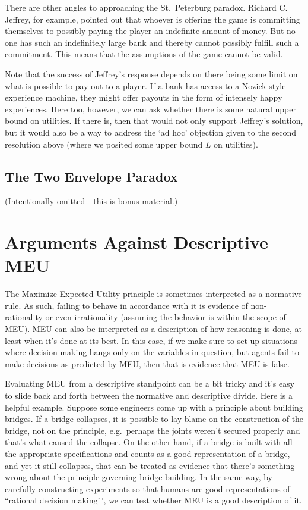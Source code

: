 \documentclass[]{tufte-book}
\begin{document}
There are other angles to approaching the St.~Peterburg paradox. Richard C. Jeffrey, for example, pointed out that whoever is offering the game is committing themselves to possibly paying the player an indefinite amount of money. But no one has such an indefinitely large bank and thereby cannot possibly fulfill such a commitment. This means that the assumptions of the game cannot be valid.

Note that the success of Jeffrey's response depends on there being some limit on what is possible to pay out to a player. If a bank has access to a Nozick-style experience machine, they might offer payouts in the form of intensely happy experiences. Here too, however, we can ask whether there is some natural upper bound on utilities. If there is, then that would not only support Jeffrey's solution, but it would also be a way to address the `ad hoc' objection given to the second resolution above (where we posited some upper bound \(L\) on utilities).

\hypertarget{the-two-envelope-paradox}{%
\subsection{The Two Envelope Paradox}\label{the-two-envelope-paradox}}

(Intentionally omitted - this is bonus material.)

\hypertarget{arguments-against-descriptive-meu}{%
\section{Arguments Against Descriptive MEU}\label{arguments-against-descriptive-meu}}

The Maximize Expected Utility principle is sometimes interpreted as a normative rule. As such, failing to behave in accordance with it is evidence of non-rationality or even irrationality (assuming the behavior is within the scope of MEU). MEU can also be interpreted as a description of how reasoning is done, at least when it's done at its best. In this case, if we make sure to set up situations where decision making hangs only on the variables in question, but agents fail to make decisions as predicted by MEU, then that is evidence that MEU is false.

Evaluating MEU from a descriptive standpoint can be a bit tricky and it's easy to slide back and forth between the normative and descriptive divide. Here is a helpful example. Suppose some engineers come up with a principle about building bridges. If a bridge collapses, it is possible to lay blame on the construction of the bridge, not on the principle, e.g.~perhaps the joints weren't secured properly and that's what caused the collapse. On the other hand, if a bridge is built with all the appropriate specifications and counts as a good representation of a bridge, and yet it still collapses, that can be treated as evidence that there's something wrong about the principle governing bridge building. In the same way, by carefully constructing experiments so that humans are good representations of ``rational decision making'\,', we can test whether MEU is a good description of it.
\end{document}
